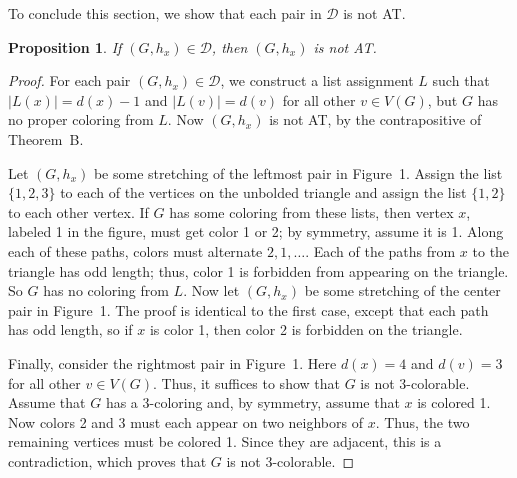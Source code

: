 \documentclass[12pt]{article}
\theoremstyle{plain}
\newtheorem{prop}[thm]{Proposition}
\theoremstyle{definition}
\theoremstyle{remark}
\newcommand{\fancy}[1]{\mathcal{#1}}
\newcommand{\D}{\fancy{D}}
\def\D{\fancy{D}}
\begin{document}
To conclude this section, we show that each pair in $\D$ is not AT.
\begin{prop}
If $(G,h_x)\in \D$, then $(G,h_x)$ is not AT.
\label{prop:easyD}
\end{prop}
\begin{proof}
For each pair $(G,h_x)\in \D$, we construct a list assignment $L$ such that
$|L(x)|=d(x)-1$ and $|L(v)|=d(v)$ for all other $v\in V(G)$, but $G$ has no
proper coloring from $L$.  Now $(G,h_x)$ is not AT, by the contrapositive of
Theorem~B.

Let $(G,h_x)$ be some stretching of the leftmost pair in Figure~1. Assign the
list $\{1,2,3\}$ to each of the vertices on the unbolded triangle and assign the
list $\{1,2\}$ to each other vertex.  If $G$ has some coloring from these lists,
then vertex $x$, labeled 1 in the figure, must get color 1 or 2; by symmetry,
assume it is 1.  Along each of these paths, colors must alternate $2, 1,
\ldots$.  Each of the paths from $x$ to the triangle has odd length; thus,
color 1 is forbidden from appearing on the triangle.  So $G$ has no coloring
from $L$.  Now let $(G,h_x)$ be some stretching of the center pair in Figure~1.
The proof is identical to the first case, except that each path has odd length,
so if $x$ is color 1, then color 2 is forbidden on the triangle.

Finally, consider the rightmost pair in Figure~1.  Here $d(x)=4$ and $d(v)=3$
for all other $v\in V(G)$.  Thus, it suffices to show that $G$ is not
3-colorable.  Assume that $G$ has a 3-coloring and, by symmetry, assume that $x$
is colored 1.  Now colors 2 and 3 must each appear on two neighbors of $x$.
Thus, the two remaining vertices must be colored 1.  Since they are adjacent,
this is a contradiction, which proves that $G$ is not 3-colorable.
\end{proof}
\end{document}
